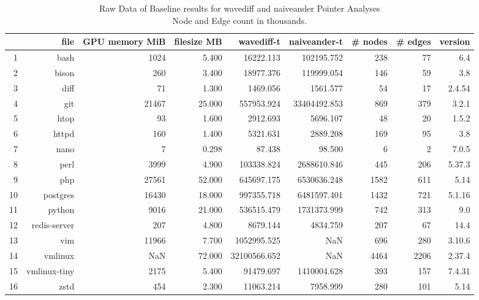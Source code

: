 \begin{table}[ht]
    \tiny
    \begin{tabular}{rrrrrrrrr}
        \toprule
           & file         & GPU memory MiB & filesize MB & wavediff-t   & naiveander-t & \# nodes & \# edges & version \\
        \midrule
        1  & bash         & 1024           & 5.400       & 16222.113    & 102195.752   & 238      & 77       & 6.4     \\
        2  & bison        & 260            & 3.400       & 18977.376    & 119999.054   & 146      & 59       & 3.8     \\
        3  & diff         & 71             & 1.300       & 1469.056     & 1561.577     & 54       & 17       & 2.4.54  \\
        4  & git          & 21467          & 25.000      & 557953.924   & 33404492.853 & 869      & 379      & 3.2.1   \\
        5  & htop         & 93             & 1.600       & 2912.693     & 5696.107     & 48       & 20       & 1.5.2   \\
        6  & httpd        & 160            & 1.400       & 5321.631     & 2889.208     & 169      & 95       & 3.8     \\
        7  & nano         & 7              & 0.298       & 87.438       & 98.500       & 6        & 2        & 7.0.5   \\
        8  & perl         & 3999           & 4.900       & 103338.824   & 2688610.846  & 445      & 206      & 5.37.3  \\
        9  & php          & 27561          & 52.000      & 645697.175   & 6530636.248  & 1582     & 611      & 5.14    \\
        10 & postgres     & 16430          & 18.000      & 997355.718   & 6481597.401  & 1432     & 721      & 5.1.16  \\
        11 & python       & 9016           & 21.000      & 536515.479   & 1731373.999  & 742      & 313      & 9.0     \\
        12 & redis-server & 207            & 4.800       & 8679.144     & 4834.759     & 207      & 67       & 14.4    \\
        13 & vim          & 11966          & 7.700       & 1052995.525  & NaN          & 696      & 280      & 3.10.6  \\
        14 & vmlinux      & NaN            & 72.000      & 32100566.652 & NaN          & 4464     & 2206     & 2.37.4  \\
        15 & vmlinux-tiny & 2175           & 5.400       & 91479.697    & 1410004.628  & 393      & 157      & 7.4.31  \\
        16 & zstd         & 454            & 2.300       & 11063.214    & 7958.999     & 280      & 101      & 5.14    \\
        \bottomrule
    \end{tabular}

    \caption[Raw Data of Baseline results for wavediff and naiveander Pointer Analyses]{Raw Data of Baseline results for wavediff and naiveander Pointer Analyses\\Node and Edge count in thousands.}
\end{table}

